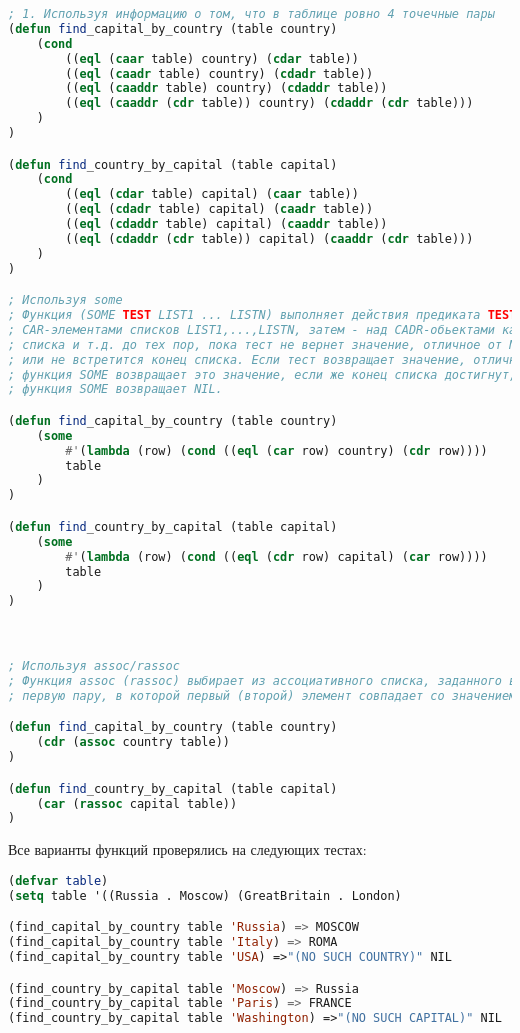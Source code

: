 \documentclass[12pt]{report}
\begin{document}
\begin{lstlisting}[language=Lisp]
; 1. Используя информацию о том, что в таблице ровно 4 точечные пары
(defun find_capital_by_country (table country)
	(cond
		((eql (caar table) country) (cdar table))
		((eql (caadr table) country) (cdadr table))
		((eql (caaddr table) country) (cdaddr table))
		((eql (caaddr (cdr table)) country) (cdaddr (cdr table)))
	)
)

(defun find_country_by_capital (table capital)
	(cond
		((eql (cdar table) capital) (caar table))
		((eql (cdadr table) capital) (caadr table))
		((eql (cdaddr table) capital) (caaddr table))
		((eql (cdaddr (cdr table)) capital) (caaddr (cdr table)))
	)
)

; Используя some
; Функция (SOME TEST LIST1 ... LISTN) выполняет действия предиката TEST над 
; CAR-элементами списков LIST1,...,LISTN, затем - над CADR-обьектами каждого
; списка и т.д. до тех пор, пока тест не вернет значение, отличное от NIL, 
; или не встретится конец списка. Если тест возвращает значение, отличное от NIL, 
; функция SOME возвращает это значение, если же конец списка достигнут, 
; функция SOME возвращает NIL.

(defun find_capital_by_country (table country)
	(some 
		#'(lambda (row) (cond ((eql (car row) country) (cdr row)))) 
		table
	) 
)

(defun find_country_by_capital (table capital)
	(some 
		#'(lambda (row) (cond ((eql (cdr row) capital) (car row)))) 
		table
	) 
)



; Используя assoc/rassoc
; Функция assoc (rassoc) выбирает из ассоциативного списка, заданного вторым аргументом, 
; первую пару, в которой первый (второй) элемент совпадает со значением первого аргумента. 

(defun find_capital_by_country (table country)
	(cdr (assoc country table))
)

(defun find_country_by_capital (table capital)
	(car (rassoc capital table))
)
\end{lstlisting}

Все варианты функций проверялись на следующих тестах:
\begin{lstlisting}[language=Lisp]
(defvar table)
(setq table '((Russia . Moscow) (GreatBritain . London)                  (France . Paris) (Italy . Roma)))

(find_capital_by_country table 'Russia) => MOSCOW
(find_capital_by_country table 'Italy) => ROMA
(find_capital_by_country table 'USA) =>"(NO SUCH COUNTRY)" NIL

(find_country_by_capital table 'Moscow) => Russia
(find_country_by_capital table 'Paris) => FRANCE
(find_country_by_capital table 'Washington) =>"(NO SUCH CAPITAL)" NIL
\end{lstlisting}
\end{document}
